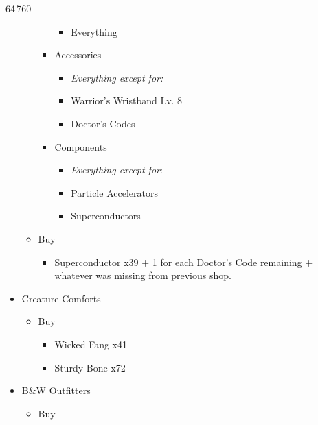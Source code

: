 \begin{multicols}{2}
\begin{shop}{64\,760}
\begin{itemize}
\begin{itemize}
\begin{itemize}
\begin{itemize}
                              \item Everything
                            \end{itemize}
                      \item Accessories
                            \begin{itemize}
                              \item \textit{Everything except for:}
                              \item Warrior's Wristband Lv. 8
                              \item Doctor's Codes
                            \end{itemize}
                      \item Components
                            \begin{itemize}
                              \item \textit{Everything except for}:
                              \item Particle Accelerators
                              \item Superconductors
                            \end{itemize}
                    \end{itemize}
              \item Buy
                    \begin{itemize}
                      \item Superconductor x39 + 1 for each Doctor's Code remaining + whatever was missing from previous shop.
                    \end{itemize}
            \end{itemize}
      \item Creature Comforts
            \begin{itemize}
              \item Buy
                    \begin{itemize}
                      \item Wicked Fang x41
                      \item Sturdy Bone x72
                    \end{itemize}
            \end{itemize}
      \item B\&W Outfitters
            \begin{itemize}
              \item Buy
                    \begin{itemize}

\end{itemize}
\end{itemize}
\end{itemize}
\end{shop}
\end{multicols}
